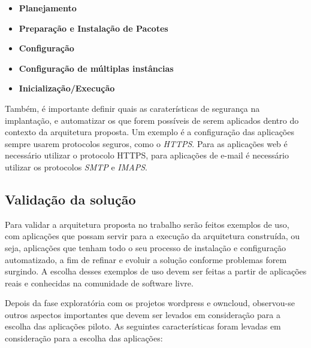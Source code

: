 \begin{itemize}
  \item  \textbf{Planejamento} 
  \item  \textbf{Preparação e Instalação de Pacotes}   
  \item  \textbf{Configuração}   
  \item  \textbf{Configuração de múltiplas instâncias}   
  \item  \textbf{Inicialização/Execução} 
\end{itemize}

Também, é importante definir quais as caraterísticas de segurança na implantação, e
automatizar os que forem possíveis de serem aplicados dentro do contexto da
arquitetura proposta. Um exemplo
é a configuração das aplicações sempre usarem protocolos seguros, como o \textit{HTTPS}. 
Para as aplicações web é necessário utilizar o protocolo HTTPS, para aplicações
de e-mail é necessário utilizar os protocolos \textit{SMTP} e \textit{IMAPS}.

\subsection{Validação da solução}
\label{subsection:validacao}

Para validar a arquitetura proposta no trabalho serão feitos exemplos de uso,
com aplicações que possam servir para a execução da arquitetura construída, ou seja,
aplicações que tenham todo o seu processo de instalação e configuração automatizado, a
fim de refinar e evoluir a solução conforme problemas forem surgindo. A escolha
desses exemplos de uso devem ser feitas a partir de aplicações reais e
conhecidas na comunidade de software livre. 


Depois da fase exploratória com os projetos wordpress e owncloud, observou-se 
outros aspectos importantes que devem ser levados em consideração para 
a escolha das aplicações piloto. As seguintes características foram levadas em consideração
para a escolha das aplicações:

